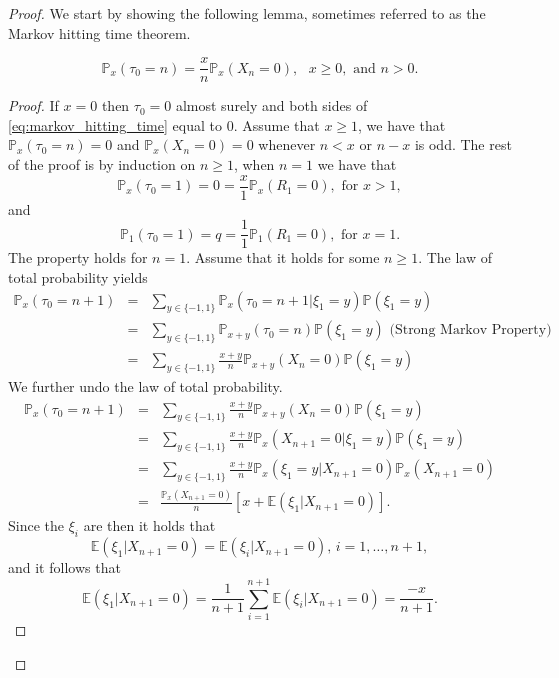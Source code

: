 \begin{proof}
We start by showing the following lemma, sometimes referred to as the Markov hitting time theorem.
\begin{lemma}\label{lem:markov_hitting_time}
\begin{equation}\label{eq:markov_hitting_time}
\mathbb{P}_x(\tau_0 = n) = \frac{x}{n}\mathbb{P}_x(X_n = 0),\text{ }x\geq 0,\text{ and }n> 0.
\end{equation}
\end{lemma}
\begin{proof}
If $x = 0$ then $\tau_0 = 0$ almost surely and both sides of \eqref{eq:markov_hitting_time} equal to $0$. Assume that $x\geq1$, we have that $\mathbb{P}_x(\tau_0 = n) = 0$ and $\mathbb{P}_x(X_n = 0) = 0$ whenever $n<x$ or $n-x$ is odd. The rest of the proof is by induction on $n\geq1$, when $n = 1$ we have that 
$$
\mathbb{P}_x(\tau_0 = 1) = 0 = \frac{x}{1}\mathbb{P}_x(R_1 = 0),\text{ for }x>1, 
$$
and 
$$\mathbb{P}_1(\tau_0 = 1) = q = \frac{1}{1}\mathbb{P}_1(R_1 = 0),\text{ for }x=1. 
$$
The property holds for $n=1$. Assume that it holds for some $n\geq1$. The law of total probability yields
\begin{eqnarray*}
\mathbb{P}_x(\tau_0 = n+1)&=&\sum_{y\in\{-1,1\}}\mathbb{P}_x(\tau_0 = n+1|\xi_1 = y)\mathbb{P}(\xi_1 = y)\\
&=&\sum_{y\in\{-1,1\}}\mathbb{P}_{x+y}(\tau_0 = n)\mathbb{P}(\xi_1 = y) \text{ (Strong Markov Property)}\\
&=&\sum_{y\in\{-1,1\}}\frac{x+y}{n}\mathbb{P}_{x+y}(X_n = 0)\mathbb{P}(\xi_1 = y)
\end{eqnarray*}
We further undo the law of total probability.
\begin{eqnarray}
\mathbb{P}_x(\tau_0 = n+1)&=&\sum_{y\in\{-1,1\}}\frac{x+y}{n}\mathbb{P}_{x+y}(X_n = 0)\mathbb{P}(\xi_1 = y)\nonumber\\
&=&\sum_{y\in\{-1,1\}}\frac{x+y}{n}\mathbb{P}_{x}(X_{n+1} = 0|\xi_1 = y)\mathbb{P}(\xi_1 = y)\nonumber\\
&=&\sum_{y\in\{-1,1\}}\frac{x+y}{n}\mathbb{P}_{x}(\xi_1 = y|X_{n+1} = 0)\mathbb{P}_x(X_{n+1} = 0)\nonumber\\
&=&\frac{\mathbb{P}_x(X_{n+1} = 0)}{n}\left[x+\mathbb{E}(\xi_1|X_{n+1}=0)\right].\label{eq:law_total_probability_undone}
\end{eqnarray}
Since the $\xi_i$ are \iid then it holds that 
$$
\mathbb{E}(\xi_1|X_{n+1}=0) = \mathbb{E}(\xi_i|X_{n+1}=0)\text{, } i = 1, \ldots, n+1,
$$
and it follows that 
$$
\mathbb{E}(\xi_1|X_{n+1}=0) = \frac{1}{n+1}\sum_{i =1}^{n+1}\mathbb{E}(\xi_i|X_{n+1}=0) = \frac{-x}{n+1}.
$$
\end{proof}
\end{proof}
